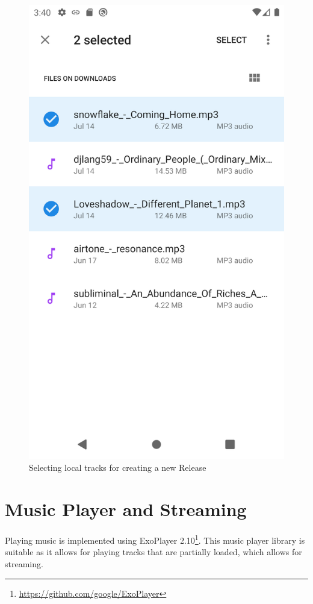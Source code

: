 \begin{figure}
        \includegraphics[width=\linewidth]{implementation/screenshot-submit-release.png}
        \caption{Selecting local tracks for creating a new Release}
        \label{fig:select-tracks}
    \endminipage
\end{figure}
\section{Music Player and Streaming}
Playing music is implemented using ExoPlayer 2.10\footnote{\url{https://github.com/google/ExoPlayer}}. This music player library is suitable as it allows for playing tracks that are partially loaded, which allows for streaming.
